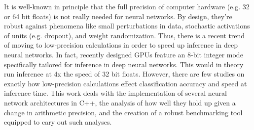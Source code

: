 It is well-known in principle that the full precision of computer hardware (e.g. 32 or 64 bit floats) is not really needed for neural networks. By design, they're robust against phenomena like small perturbations in data, stochastic activations of units (e.g. dropout), and weight randomization. Thus, there is a recent trend of moving to low-precision calculations in order to speed up inference in deep neural networks. In fact, recently designed GPUs feature an 8-bit integer mode specifically tailored for inference in deep neural networks. This would in theory run inference at 4x the speed of 32 bit floats. However, there are few studies on exactly how low-precision calculations effect classification accuracy and speed at inference time. This work deals with the implementation of several neural network architectures in C++, the analysis of how well they hold up given a change in arithmetic precision, and the creation of a robust benchmarking tool equipped to cary out such analyses.